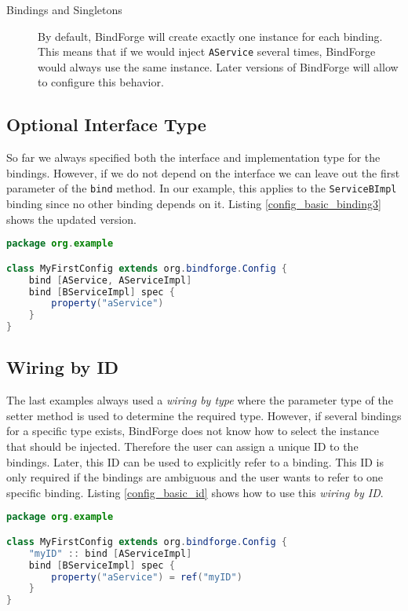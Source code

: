 \begin{description}
 \item[Bindings and Singletons] By default, BindForge will create exactly one instance for each binding. This means that if we would inject \verb!AService! several times, BindForge would always use the same instance. Later versions of BindForge will allow to configure this behavior.
\end{description}

\subsection{Optional Interface Type}

So far we always specified both the interface and implementation type for the bindings. However, if we do not depend on the interface we can leave out the first parameter of the \verb!bind! method. In our example, this applies to the \verb!ServiceBImpl! binding since no other binding depends on it. Listing \ref{config_basic_binding3} shows the updated version.

\begin{lstlisting}[caption={Optional interface type},label=config_basic_binding3,language=Java]
package org.example

class MyFirstConfig extends org.bindforge.Config {
    bind [AService, AServiceImpl]
    bind [BServiceImpl] spec {
        property("aService")
    }
}
\end{lstlisting}

\subsection{Wiring by ID}

The last examples always used a \textit{wiring by type} where the parameter type of the setter method is used to determine the required type. However, if several bindings for a specific type exists, BindForge does not know how to select the instance that should be injected. Therefore the user can assign a unique ID to the bindings. Later, this ID can be used to explicitly refer to a binding. This ID is only required if the bindings are ambiguous and the user wants to refer to one specific binding. Listing \ref{config_basic_id} shows how to use this \textit{wiring by ID}.

\begin{lstlisting}[caption={Bindings with ID},label=config_basic_id,language=Java]
package org.example

class MyFirstConfig extends org.bindforge.Config {
    "myID" :: bind [AServiceImpl]
    bind [BServiceImpl] spec {
        property("aService") = ref("myID")
    }
}
\end{lstlisting}

